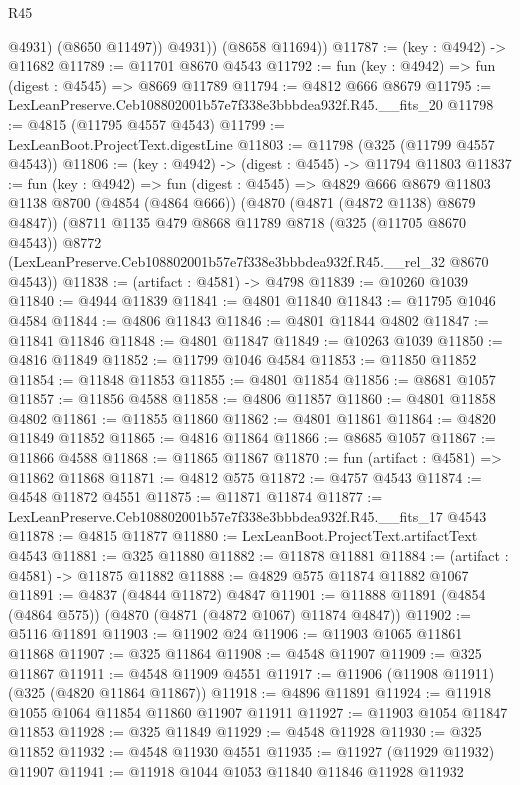 \begin{lexlean}{R45}
\begin{coremodule}
              @4931)
            (@8650 @11497))
          @4931))
      (@8658 @11694))
@11787 := (key : @4942) -> @11682
@11789 := @11701 @8670 @4543
@11792 := fun (key : @4942) => fun (digest : @4545) => @8669 @11789
@11794 := @4812 @666 @8679
@11795 := LexLeanPreserve.Ceb108802001b57e7f338e3bbbdea932f.R45.__fits_20
@11798 := @4815 (@11795 @4557 @4543)
@11799 := LexLeanBoot.ProjectText.digestLine
@11803 := @11798 (@325 (@11799 @4557 @4543))
@11806 := (key : @4942) -> (digest : @4545) -> @11794 @11803
@11837 := fun (key : @4942) =>
  fun (digest : @4545) =>
  @4829
    @666
    @8679
    @11803
    @1138
    @8700
    (@4854 (@4864 @666))
    (@4870 (@4871 (@4872 @1138) @8679 @4847))
    (@8711
      @1135
      @479
      @8668
      @11789
      @8718
      (@325 (@11705 @8670 @4543))
      @8772
      (LexLeanPreserve.Ceb108802001b57e7f338e3bbbdea932f.R45.__rel_32 @8670 @4543))
@11838 := (artifact : @4581) -> @4798
@11839 := @10260 @1039
@11840 := @4944 @11839
@11841 := @4801 @11840
@11843 := @11795 @1046 @4584
@11844 := @4806 @11843
@11846 := @4801 @11844 @4802
@11847 := @11841 @11846
@11848 := @4801 @11847
@11849 := @10263 @1039
@11850 := @4816 @11849
@11852 := @11799 @1046 @4584
@11853 := @11850 @11852
@11854 := @11848 @11853
@11855 := @4801 @11854
@11856 := @8681 @1057
@11857 := @11856 @4588
@11858 := @4806 @11857
@11860 := @4801 @11858 @4802
@11861 := @11855 @11860
@11862 := @4801 @11861
@11864 := @4820 @11849 @11852
@11865 := @4816 @11864
@11866 := @8685 @1057
@11867 := @11866 @4588
@11868 := @11865 @11867
@11870 := fun (artifact : @4581) => @11862 @11868
@11871 := @4812 @575
@11872 := @4757 @4543
@11874 := @4548 @11872 @4551
@11875 := @11871 @11874
@11877 := LexLeanPreserve.Ceb108802001b57e7f338e3bbbdea932f.R45.__fits_17 @4543
@11878 := @4815 @11877
@11880 := LexLeanBoot.ProjectText.artifactText @4543
@11881 := @325 @11880
@11882 := @11878 @11881
@11884 := (artifact : @4581) -> @11875 @11882
@11888 := @4829 @575 @11874 @11882 @1067
@11891 := @4837 (@4844 @11872) @4847
@11901 := @11888 @11891 (@4854 (@4864 @575)) (@4870 (@4871 (@4872 @1067) @11874 @4847))
@11902 := @5116 @11891
@11903 := @11902 @24
@11906 := @11903 @1065 @11861 @11868
@11907 := @325 @11864
@11908 := @4548 @11907
@11909 := @325 @11867
@11911 := @4548 @11909 @4551
@11917 := @11906 (@11908 @11911) (@325 (@4820 @11864 @11867))
@11918 := @4896 @11891
@11924 := @11918 @1055 @1064 @11854 @11860 @11907 @11911
@11927 := @11903 @1054 @11847 @11853
@11928 := @325 @11849
@11929 := @4548 @11928
@11930 := @325 @11852
@11932 := @4548 @11930 @4551
@11935 := @11927 (@11929 @11932) @11907
@11941 := @11918 @1044 @1053 @11840 @11846 @11928 @11932

\end{coremodule}
\end{lexlean}

